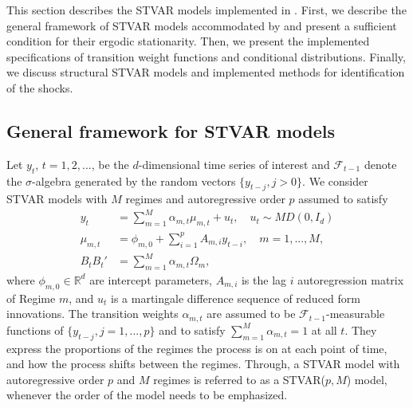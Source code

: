 \documentclass[nojss]{jss}
\begin{document}
This section describes the STVAR models implemented in . First, we describe the general framework of STVAR models accommodated by  and present a sufficient condition for their ergodic stationarity. Then, we present the implemented specifications of transition weight functions and conditional distributions. Finally, we discuss structural STVAR models and implemented methods for identification of the shocks.


\subsection{General framework for STVAR models}\label{sec:genstvar}

Let $y_t$, $t=1,2,...$, be the $d$-dimensional time series of interest and $\mathcal{F}_{t-1}$ denote the $\sigma$-algebra generated by the random vectors $\lbrace y_{t-j}, j>0 \rbrace$. We consider STVAR models with $M$ regimes and autoregressive order $p$ assumed to satisfy
\begin{align}
y_t &=\sum_{m=1}^M \alpha_{m,t}\mu_{m,t} + u_t, \quad u_{t} \sim MD(0, I_d)\label{eq:stvar1} \\
\mu_{m,t} &= \phi_{m,0} + \sum_{i=1}^{p}A_{m,i}y_{t-i}, \quad m=1,...,M,\label{eq:stvar2}\\
B_tB_t' &= \sum_{m=1}^M \alpha_{m,t}\Omega_m, \label{eq:stvar3}
\end{align}
where $\phi_{m,0}\in\mathbb{R}^{d}$ are intercept parameters, $A_{m,i}$ is the lag $i$ autoregression matrix  of Regime $m$, and $u_t$ is a martingale difference sequence of reduced form innovations. %
The transition weights $\alpha_{m,t}$ are assumed to be $\mathcal{F}_{t-1}$-measurable functions of $\lbrace y_{t-j}, j=1,...,p \rbrace$ and to satisfy $\sum_{m=1}^{M}\alpha_{m,t}=1$ at all $t$. They express the proportions of the regimes the process is on at each point of time, and how the process shifts between the regimes. Through, a STVAR model with autoregressive order $p$ and $M$ regimes is referred to as a STVAR($p,M$) model, whenever the order of the model needs to be emphasized.
\end{document}
